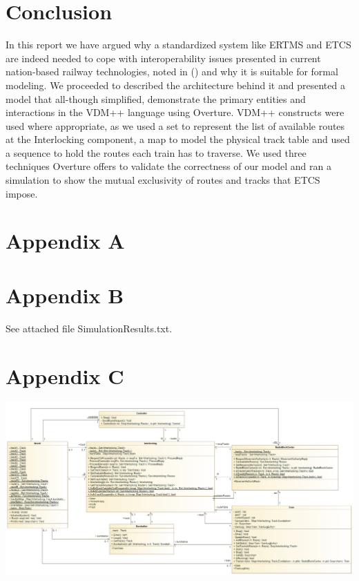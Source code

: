 \documentclass[preprint,12pt]{elsarticle}
\begin{document}
\section{Conclusion}

In this report we have argued why a standardized system like ERTMS and ETCS are indeed needed to cope with interoperability issues presented in current nation-based railway technologies, noted in (\citet{Commission2018}) and why it is suitable for formal modeling. We proceeded to described the architecture behind it and presented a model that all-though simplified, demonstrate the primary entities and interactions in the VDM++ language using Overture. VDM++ constructs were used where appropriate, as we used a set to represent the list of available routes at the Interlocking component, a map to model the physical track table and used a sequence to hold the routes each train has to traverse. We used three techniques Overture offers to validate the correctness of our model and ran a simulation to show the mutual exclusivity of routes and tracks that ETCS impose.




\appendix
\section*{Appendix A}


\section*{Appendix B}
See attached file SimulationResults.txt.

\section*{Appendix C}
\includegraphics[angle=90,scale=0.35]{ERTMSModel.png}
\end{document}
